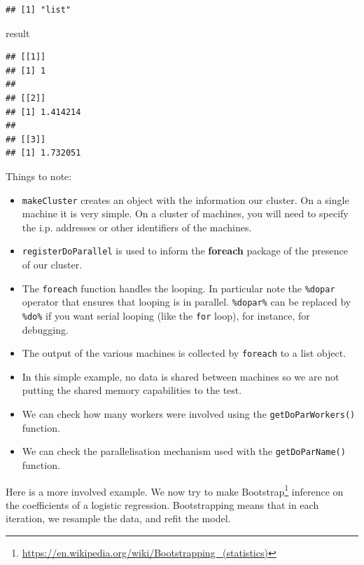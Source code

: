 \documentclass[]{book}
\newenvironment{Shaded}{\begin{snugshade}}{\end{snugshade}}
\newcommand{\NormalTok}[1]{#1}
\providecommand{\tightlist}{%
  \setlength{\itemsep}{0pt}\setlength{\parskip}{0pt}}
\renewcommand{\href}[2]{#2\footnote{\url{#1}}}
\theoremstyle{definition}
\theoremstyle{definition}
\theoremstyle{definition}
\theoremstyle{remark}
\begin{document}
\begin{verbatim}
## [1] "list"
\end{verbatim}

\begin{Shaded}
\begin{Highlighting}[]
\NormalTok{result}
\end{Highlighting}
\end{Shaded}

\begin{verbatim}
## [[1]]
## [1] 1
## 
## [[2]]
## [1] 1.414214
## 
## [[3]]
## [1] 1.732051
\end{verbatim}

Things to note:

\begin{itemize}
\tightlist
\item
  \texttt{makeCluster} creates an object with the information our cluster.
  On a single machine it is very simple. On a cluster of machines, you will need to specify the i.p. addresses or other identifiers of the machines.
\item
  \texttt{registerDoParallel} is used to inform the \textbf{foreach} package of the presence of our cluster.
\item
  The \texttt{foreach} function handles the looping. In particular note the \texttt{\%dopar} operator that ensures that looping is in parallel. \texttt{\%dopar\%} can be replaced by \texttt{\%do\%} if you want serial looping (like the \texttt{for} loop), for instance, for debugging.
\item
  The output of the various machines is collected by \texttt{foreach} to a list object.
\item
  In this simple example, no data is shared between machines so we are not putting the shared memory capabilities to the test.
\item
  We can check how many workers were involved using the \texttt{getDoParWorkers()} function.
\item
  We can check the parallelisation mechanism used with the \texttt{getDoParName()} function.
\end{itemize}

Here is a more involved example.
We now try to make \href{https://en.wikipedia.org/wiki/Bootstrapping_(statistics)}{Bootstrap} inference on the coefficients of a logistic regression.
Bootstrapping means that in each iteration, we resample the data, and refit the model.
\end{document}
